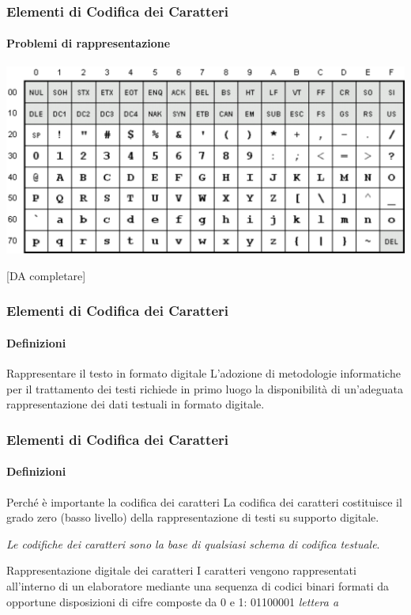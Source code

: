 \begin{frame}
	\frametitle{Elementi di Codifica dei Caratteri}
	\framesubtitle{Problemi di rappresentazione}
	\addtocounter{nframe}{1}

	\begin{center}
		\includegraphics[width=.9\textwidth]{imgs/ascii-67.pdf}
	\end{center}

	[DA completare]

\end{frame}

\begin{frame}
	\frametitle{Elementi di Codifica dei Caratteri}
	\framesubtitle{Definizioni}
	\addtocounter{nframe}{1}

	\begin{block}{Rappresentare il testo in formato digitale}
		L’adozione di metodologie informatiche per il trattamento dei testi richiede in primo luogo la disponibilità di un'adeguata rappresentazione dei dati testuali in formato digitale.
	\end{block}

\end{frame}

\begin{frame}
	\frametitle{Elementi di Codifica dei Caratteri}
	\framesubtitle{Definizioni}
	\addtocounter{nframe}{1}

	\begin{block}{Perché è importante la codifica dei caratteri}
		La codifica dei caratteri costituisce il grado zero (basso livello) della rappresentazione di testi su supporto digitale.
		\begin{center}
			\textit{Le codifiche dei caratteri sono la base di qualsiasi schema di codifica testuale}.
		\end{center}
	\end{block}



	\begin{block}{Rappresentazione digitale dei caratteri}
		I caratteri vengono rappresentati all’interno di un elaboratore mediante una sequenza di codici binari formati da opportune disposizioni di cifre composte da 0 e 1: 01100001 \textit{lettera a}
	\end{block}

\end{frame}



